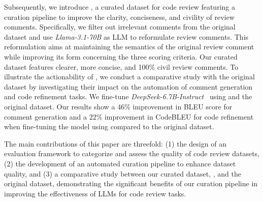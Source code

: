 Subsequently, we introduce \oapp, a curated dataset for code review featuring a curation pipeline to improve the clarity, conciseness, and civility of review comments. 
Specifically, we filter out irrelevant comments from the original dataset and use \emph{Llama-3.1-70B} as LLM to reformulate review comments. 
This reformulation aims at maintaining the semantics of the original review comment while improving its form concerning the three scoring criteria. 
Our curated dataset features clearer, more concise, and 100\% civil review comments. 
To illustrate the actionability of \oapp, we conduct a comparative study with the original dataset by investigating their impact on the automation of comment generation and code refinement tasks.
We fine-tune \emph{DeepSeek-6.7B-Instruct}~\cite{deepseek-coder} using \oapp and the original dataset. 
Our results show a 46\% improvement in BLEU score for comment generation and a 22\% improvement in CodeBLEU for code refinement when fine-tuning the model using \oapp compared to the original dataset.

The main contributions of this paper are threefold: (1) the design of an evaluation framework to categorize and assess the quality of code review datasets, (2) the development of an automated curation pipeline to enhance dataset quality, and (3) a comparative study between our curated dataset, \oapp, and the original dataset, demonstrating the significant benefits of our curation pipeline in improving the effectiveness of LLMs for code review tasks.





